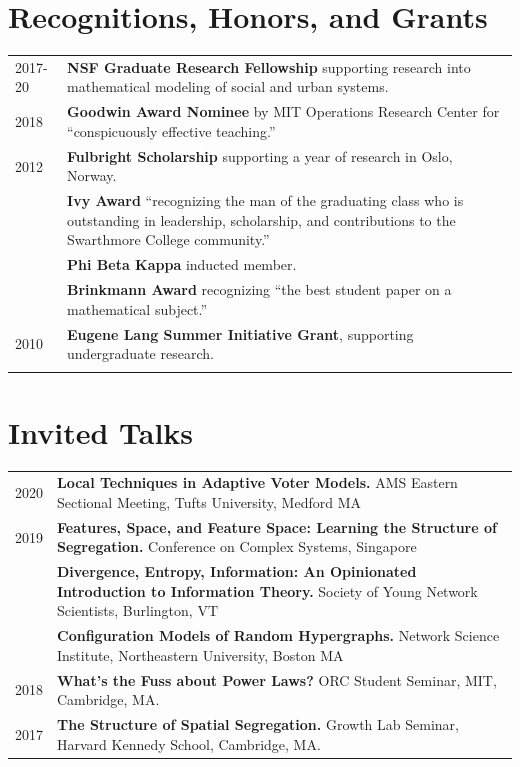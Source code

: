 \documentclass[11pt,fullpage]{article}
\newcommand{\hide}[1]{
 
 
   \iftoggle{Long}{
   #1
   }{}
}
\begin{document}
\section*{Recognitions, Honors, and Grants}
	\vspace{-10pt}
	\setlength{\extrarowheight}{5pt}
	\begin{longtable}{p{0.6in}|p{5.5in}}
		2017-20 & {\bf NSF Graduate Research Fellowship} supporting research into mathematical modeling of social and urban systems. \\ 
		2018 & {\bf Goodwin Award Nominee} by MIT Operations Research Center for ``conspicuously effective teaching.'' \\ 
		2012 & {\bf Fulbright Scholarship} supporting a year of research in Oslo, Norway. \\
			 & {\bf Ivy Award} ``recognizing the man of the graduating class who is outstanding in leadership, scholarship, and contributions to the Swarthmore College community.''\\
			 & {\bf Phi Beta Kappa} inducted member. \\
		\hide{
			& {\bf Brinkmann Award} recognizing ``the best student paper on a mathematical subject.'' \\
			2010 & {\bf Eugene Lang Summer Initiative Grant}, supporting undergraduate research. \\}
	\end{longtable}


\section*{Invited Talks}
	\vspace{-10pt}
	\begin{longtable}{p{0.6in}|p{5.5in}}
	2020 & \textbf{Local Techniques in Adaptive Voter Models.} AMS Eastern Sectional Meeting, Tufts University, Medford MA \\
	2019 & \textbf{Features, Space, and Feature Space: Learning the Structure of Segregation.} Conference on Complex Systems, Singapore \\ 
	& \textbf{Divergence, Entropy, Information: An Opinionated Introduction to Information Theory.} Society of Young Network Scientists, Burlington, VT \\ 
	& \textbf{Configuration Models of Random Hypergraphs.} Network Science Institute, Northeastern University, Boston MA \\ 
	2018 & \textbf{What's the Fuss about Power Laws?} ORC Student Seminar, MIT, Cambridge, MA. \\ 
	2017 & \textbf{The Structure of Spatial Segregation.} Growth Lab Seminar, Harvard Kennedy School, Cambridge, MA. 
	\end{longtable}
\end{document}

